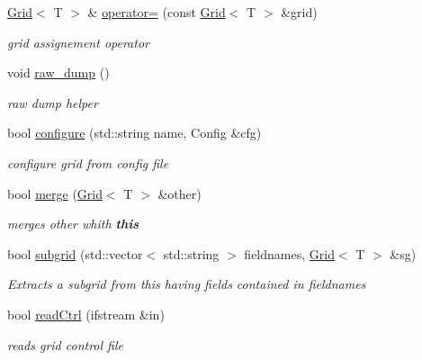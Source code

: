 \begin{DoxyCompactItemize}
\hyperlink{classfwi_1_1grid_1_1Grid}{Grid}$<$ T $>$ \& \hyperlink{classfwi_1_1grid_1_1Grid_a8cbde1277dbb531069c1b579cb10410f}{operator=} (const \hyperlink{classfwi_1_1grid_1_1Grid}{Grid}$<$ T $>$ \&grid)
\begin{DoxyCompactList}\small\item\em grid assignement operator \end{DoxyCompactList}\item 
\hypertarget{classfwi_1_1grid_1_1Grid_a9e1229aefd4781e60641e1a946fb64e3}{void \hyperlink{classfwi_1_1grid_1_1Grid_a9e1229aefd4781e60641e1a946fb64e3}{raw\-\_\-dump} ()}\label{classfwi_1_1grid_1_1Grid_a9e1229aefd4781e60641e1a946fb64e3}

\begin{DoxyCompactList}\small\item\em raw dump helper \end{DoxyCompactList}\item 
bool \hyperlink{classfwi_1_1grid_1_1Grid_abfcac51edc50447a1861ce85d68409cf}{configure} (std\-::string name, Config \&cfg)
\begin{DoxyCompactList}\small\item\em configure grid from config file \end{DoxyCompactList}\item 
bool \hyperlink{classfwi_1_1grid_1_1Grid_a254a6c5a649b7d3a109f67811ef5f356}{merge} (\hyperlink{classfwi_1_1grid_1_1Grid}{Grid}$<$ T $>$ \&other)
\begin{DoxyCompactList}\small\item\em merges {\itshape other} whith {\bfseries this} \end{DoxyCompactList}\item 
bool \hyperlink{classfwi_1_1grid_1_1Grid_a099e8895d70f6ce5a5eba5ea3599704f}{subgrid} (std\-::vector$<$ std\-::string $>$ fieldnames, \hyperlink{classfwi_1_1grid_1_1Grid}{Grid}$<$ T $>$ \&sg)
\begin{DoxyCompactList}\small\item\em Extracts a subgrid from {\itshape this} having fields contained in {\itshape fieldnames} \end{DoxyCompactList}\item 
bool \hyperlink{classfwi_1_1grid_1_1Grid_a34cc464d768d11a63f6918e6a39e0415}{read\-Ctrl} (ifstream \&in)
\begin{DoxyCompactList}\small\item\em reads grid control file \end{DoxyCompactList}\item 

\end{DoxyCompactItemize}
